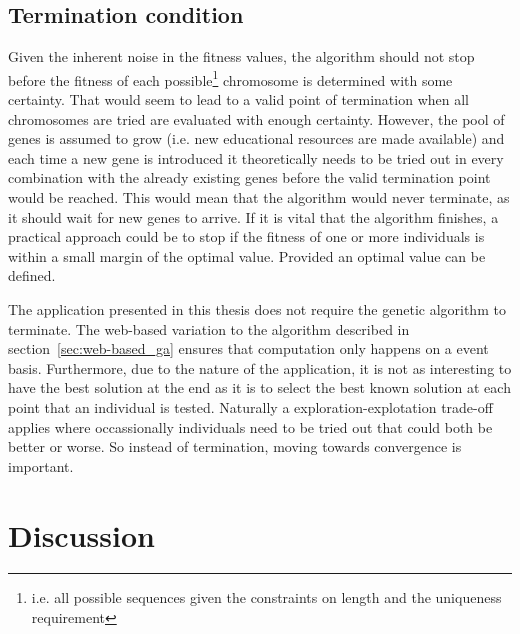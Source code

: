 \begin{itemize}
\subsection{Termination condition}
Given the inherent noise in the fitness values, the algorithm should not stop
before the fitness of each possible\footnote{i.e. all possible sequences given
the constraints on length and the uniqueness requirement} chromosome is determined
with some certainty. That would seem to lead to a valid point of termination
when all chromosomes are tried are evaluated with enough certainty. However,
the pool of genes is assumed to grow (i.e. new educational resources are made
available) and each time a new gene is introduced it theoretically needs to be
tried out in every combination with the already existing genes before the valid
termination point would be reached. This would mean that the algorithm would
never terminate, as it should wait for new genes to arrive. If it is vital that
the algorithm finishes, a practical approach could be to stop if the fitness of
one or more individuals is within a small margin of the optimal value. Provided
an optimal value can be defined.

The application presented in this thesis does not require the genetic algorithm
to terminate. The web-based variation to the algorithm described in
section~\ref{sec:web-based_ga} ensures that computation only happens on a event
basis. Furthermore, due to the nature of the application, it is not
as interesting to have the best solution at the end as it is to select the best
known solution at each point that an individual is tested. Naturally a
exploration-explotation trade-off applies where occassionally individuals need
to be tried out that could both be better or worse. So instead of termination,
moving towards convergence is important.
\section{Discussion}
\label{approach_discussion}

\end{itemize}
